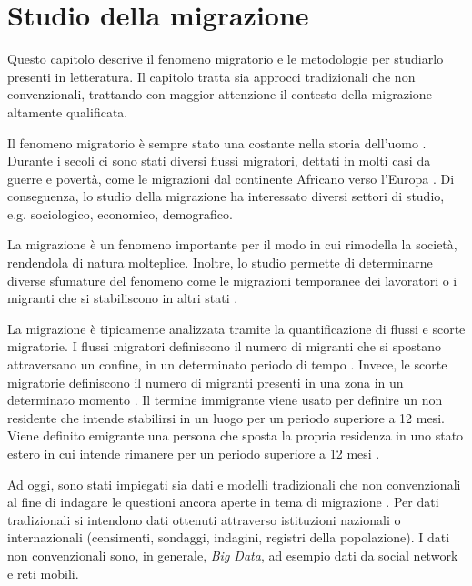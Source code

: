 
\chapter{Studio della migrazione}
\label{StudiMigrazione}
Questo capitolo descrive il fenomeno migratorio e le metodologie per studiarlo presenti in letteratura. Il capitolo tratta sia approcci tradizionali che non convenzionali, trattando con maggior attenzione il contesto della migrazione altamente qualificata.

Il fenomeno migratorio è sempre stato una costante nella storia dell'uomo \cite{sirbu2021human}.  Durante i secoli ci sono stati diversi flussi migratori, dettati in molti casi da guerre e povertà, come le migrazioni dal continente Africano verso l'Europa \cite{eurpubcku105}. Di conseguenza, lo studio della migrazione ha interessato diversi settori di studio, e.g. sociologico, economico, demografico. 

La migrazione è un fenomeno importante per il modo in cui rimodella la società, rendendola di natura molteplice. Inoltre, lo studio permette di determinarne diverse sfumature del fenomeno come le migrazioni temporanee dei lavoratori o i migranti che si stabiliscono in altri stati \cite{articleKingRussell}. 

La migrazione è tipicamente analizzata tramite la quantificazione di flussi e scorte migratorie.
I flussi migratori definiscono il numero di migranti che si spostano attraversano un confine, in un determinato periodo di tempo \cite{cherubini2016glossario}. Invece, le scorte migratorie definiscono il numero di migranti presenti in una zona in un determinato momento \cite{cherubini2016glossario}.
Il termine immigrante viene usato per definire un non residente che intende stabilirsi in un luogo per un periodo superiore a 12 mesi\cite{cherubini2016glossario}.
Viene definito emigrante una persona che sposta la propria residenza in uno stato estero in cui intende rimanere per un periodo superiore a 12 mesi \cite{cherubini2016glossario}.


Ad oggi, sono stati impiegati sia dati e modelli tradizionali che non convenzionali al fine di indagare le questioni ancora aperte in tema di migrazione \cite{sirbu2021human}. Per dati tradizionali si intendono dati ottenuti attraverso istituzioni nazionali o internazionali (censimenti, sondaggi, indagini, registri della popolazione). I dati non convenzionali sono, in generale, \textit{Big Data}, ad esempio dati da social network e reti mobili.


